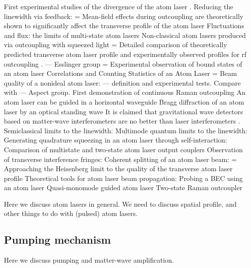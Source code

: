 First experimental studies of the divergence of the atom laser \citep{Le-Coq:2001vn}.
Reducing the linewidth via feedback: \citep{Wiseman:2001zr}
= Mean-field effects during outcoupling are theoretically shown to significantly affect the transverse profile of the atom laser \citep{Busch:2002zr}
Fluctuations and flux: the limits of multi-state atom lasers \citep{Robins:2004pz}
Non-classical atom lasers produced via outcoupling with squeezed light \citep{Haine:2005}
= Detailed comparison of theoretically predicted transverse atom laser profile and experimentally observed profiles for rf outcoupling \citep{Kohl:2005fk}. --- Esslinger group
= Experimental observation of bound states of an atom laser \citep{Robins:2005uq}
Correlations and Counting Statistics of an Atom Laser \citep{Ottl:2005}
= Beam quality of a nonideal atom laser: \citep{Riou:2006uq} --- definition and experimental tests.  Compare with \citep{Kohl:2005fk} --- Aspect group.
First demonstration of continuous Raman outcoupling \citep{Robins:2006fk}
An atom laser can be guided in a horizontal waveguide \citep{Guerin:2006mz}
Bragg diffraction of an atom laser by an optical standing wave \citep{Wu:2006fj}
It is claimed that gravitational wave detectors based on matter-wave interferometers are no better than laser interferometers \citep{Roura:2006}.
Semiclassical limits to the linewidth: \citep{Johnsson:2007}
Multimode quantum limits to the linewidth: \citep{Johnsson:2007a}
Generating quadrature squeezing in an atom laser through self-interaction: \citep{Johnsson:2007b}
Comparison of multistate and two-state atom laser output couplers \citep{Dugue:2007fk}
Observation of transverse interference fringes: \citep{Dall:2007}
Coherent splitting of an atom laser beam: \citep{Dugue:2008}
= Approaching the Heisenberg limit to the quality of the transverse atom laser profile \citep{Jeppesen:2008}
Theoretical tools for atom laser beam propagation: \citep{Riou:2008}
Probing a BEC using an atom laser \citep{Doring:2008}
Quasi-monomode guided atom laser \citep{Couvert:2008}
Two-state Raman outcoupler \citep{Debs:2009}


Here we discuss atom lasers in general.  We need to discuss spatial profile, and other things to do with (pulsed) atom lasers.

\subsection{Pumping mechanism}

Here we discuss pumping and matter-wave amplification.

